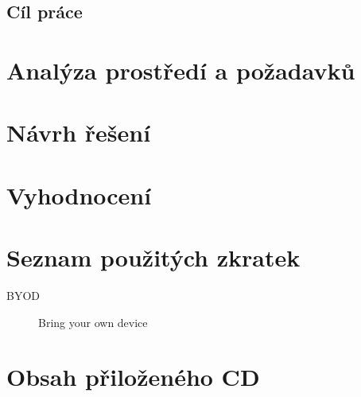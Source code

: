\documentclass[thesis=M,czech]{FITthesis}[2012/06/26]
\begin{document}
\section{Cíl práce}



 


\chapter{Analýza prostředí a požadavků}
 


\chapter{Návrh řešení}
  

\chapter{Vyhodnocení}

\begin{conclusion}
	
\end{conclusion}




\appendix

\chapter{Seznam použitých zkratek}
\begin{description}
	\item[BYOD] Bring your own device
\end{description}




\chapter{Obsah přiloženého CD}
 
\end{document}
